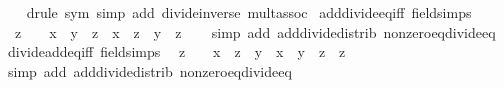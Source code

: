 \begin{isabellebody}
%
\isadelimproof
\ \ %
\endisadelimproof
%
\isatagproof
{}\isamarkupfalse%
\ {\isacharparenleft}{\kern0pt}drule\ sym{\isacharparenright}{\kern0pt}\ {\isacharparenleft}{\kern0pt}simp\ add{\isacharcolon}{\kern0pt}\ divide{\isacharunderscore}{\kern0pt}inverse\ mult{\isachardot}{\kern0pt}assoc{\isacharparenright}{\kern0pt}%
\endisatagproof
{\isafoldproof}%
%
\isadelimproof
\isanewline
%
\endisadelimproof
\isanewline
{}\isamarkupfalse%
\ add{\isacharunderscore}{\kern0pt}divide{\isacharunderscore}{\kern0pt}eq{\isacharunderscore}{\kern0pt}iff\ {\isacharbrackleft}{\kern0pt}field{\isacharunderscore}{\kern0pt}simps{\isacharbrackright}{\kern0pt}{\isacharcolon}{\kern0pt}\isanewline
\ \ {\isachardoublequoteopen}z\ {\isasymnoteq}\ {}\ {\isasymLongrightarrow}\ x\ {\isacharplus}{\kern0pt}\ y\ {\isacharslash}{\kern0pt}\ z\ {\isacharequal}{\kern0pt}\ {\isacharparenleft}{\kern0pt}x\ {\isacharasterisk}{\kern0pt}\ z\ {\isacharplus}{\kern0pt}\ y{\isacharparenright}{\kern0pt}\ {\isacharslash}{\kern0pt}\ z{\isachardoublequoteclose}\isanewline
%
\isadelimproof
\ \ %
\endisadelimproof
%
\isatagproof
{}\isamarkupfalse%
\ {\isacharparenleft}{\kern0pt}simp\ add{\isacharcolon}{\kern0pt}\ add{\isacharunderscore}{\kern0pt}divide{\isacharunderscore}{\kern0pt}distrib\ nonzero{\isacharunderscore}{\kern0pt}eq{\isacharunderscore}{\kern0pt}divide{\isacharunderscore}{\kern0pt}eq{\isacharparenright}{\kern0pt}%
\endisatagproof
{\isafoldproof}%
%
\isadelimproof
\isanewline
%
\endisadelimproof
\isanewline
{}\isamarkupfalse%
\ divide{\isacharunderscore}{\kern0pt}add{\isacharunderscore}{\kern0pt}eq{\isacharunderscore}{\kern0pt}iff\ {\isacharbrackleft}{\kern0pt}field{\isacharunderscore}{\kern0pt}simps{\isacharbrackright}{\kern0pt}{\isacharcolon}{\kern0pt}\isanewline
\ \ {\isachardoublequoteopen}z\ {\isasymnoteq}\ {}\ {\isasymLongrightarrow}\ x\ {\isacharslash}{\kern0pt}\ z\ {\isacharplus}{\kern0pt}\ y\ {\isacharequal}{\kern0pt}\ {\isacharparenleft}{\kern0pt}x\ {\isacharplus}{\kern0pt}\ y\ {\isacharasterisk}{\kern0pt}\ z{\isacharparenright}{\kern0pt}\ {\isacharslash}{\kern0pt}\ z{\isachardoublequoteclose}\isanewline
%
\isadelimproof
\ \ %
\endisadelimproof
%
\isatagproof
{}\isamarkupfalse%
\ {\isacharparenleft}{\kern0pt}simp\ add{\isacharcolon}{\kern0pt}\ add{\isacharunderscore}{\kern0pt}divide{\isacharunderscore}{\kern0pt}distrib\ nonzero{\isacharunderscore}{\kern0pt}eq{\isacharunderscore}{\kern0pt}divide{\isacharunderscore}{\kern0pt}eq{\isacharparenright}{\kern0pt}%
\endisatagproof
{\isafoldproof}%
%
\isadelimproof

\end{isabellebody}
